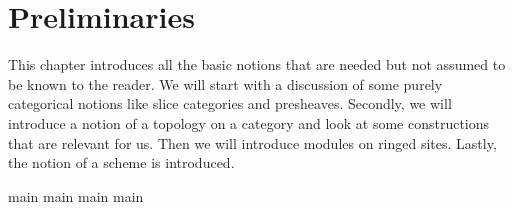 \chapter{Preliminaries}
This chapter introduces all the basic notions that are needed but not assumed to be known to the reader.
We will start with a discussion of some purely categorical notions like slice categories and presheaves.
Secondly, we will introduce a notion of a topology on a category and look at some constructions that are relevant for us.
Then we will introduce modules on ringed sites.
Lastly, the notion of a scheme is introduced.

{main}
{main}
{main}
{main}
